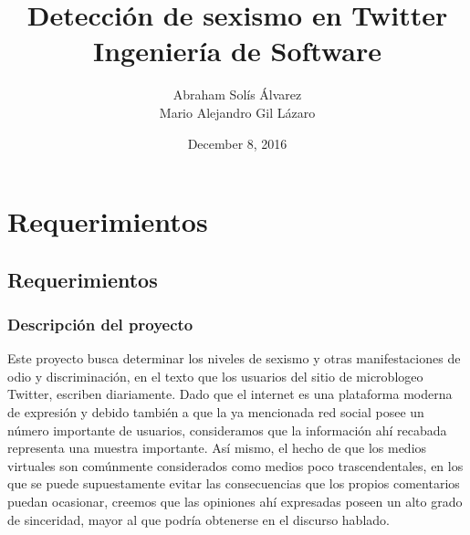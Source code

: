 \documentclass[oneside]{book}
\begin{document}



\title {Detección de sexismo en Twitter \\ Ingeniería de Software}
\author{Abraham Solís Álvarez \\ Mario Alejandro Gil Lázaro}
\date{December 8, 2016}
\maketitle


\tableofcontents

\chapter{Requerimientos}
\section{Requerimientos}
\subsection{Descripción del proyecto}
Este proyecto busca determinar los niveles de sexismo y otras manifestaciones
de odio y discriminación, en el texto que los usuarios del sitio de
microblogeo Twitter, escriben diariamente. Dado que el internet es una
plataforma moderna de expresión y debido también a que la ya mencionada red
social posee un número importante de usuarios, consideramos que la información
ahí recabada representa una muestra importante. Así mismo, el hecho de que
los medios virtuales son comúnmente considerados como medios poco
trascendentales, en los que se puede supuestamente evitar las consecuencias
que los propios comentarios puedan ocasionar, creemos que las opiniones ahí
expresadas poseen un alto grado de sinceridad, mayor al que podría obtenerse
en el discurso hablado.
\end{document}
